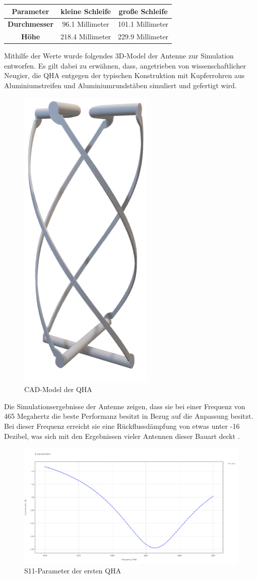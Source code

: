 \begin{center}
\begin{tabular}{|c|c|c|}
	\hline
	\textbf{Parameter} & \textbf{kleine Schleife} & \textbf{große Schleife} \\
	\hline
	\textbf{Durchmesser} & 96.1 Millimeter & 101.1 Millimeter \\
	\hline
	\textbf{Höhe} & 218.4 Millimeter & 229.9 Millimeter \\
	\hline
\end{tabular}
\end{center}

Mithilfe der Werte wurde folgendes 3D-Model der Antenne zur Simulation entworfen. Es gilt dabei zu erwähnen, dass, angetrieben von wissenschaftlicher Neugier, die QHA entgegen der typischen Konstruktion mit Kupferrohren aus Aluminiumstreifen und Aluminiumrundstäben simuliert und gefertigt wird. 

\begin{figure} [H]
	\centering
	\includegraphics[width=.25\linewidth]{../ref/qfh_render.png}
	\caption{CAD-Model der QHA}
	\label{fig:qfh_render}
\end{figure}

Die Simulationsergebnisse der Antenne zeigen, dass sie bei einer Frequenz von 465 Megahertz die beste Performanz besitzt in Bezug auf die Anpassung besitzt. Bei dieser Frequenz erreicht sie eine Rückflussdämpfung von etwas unter -16 Dezibel, was sich mit den Ergebnissen vieler Antennen dieser Bauart deckt \cite{noauthor_qfh_nodate} \cite{keller_quadrifilar_2015}.

\begin{figure} [H]
	\centering
	\includegraphics[width=\linewidth]{../ref/qfh_old_s11.png}
	\caption{S11-Parameter der ersten QHA}
	\label{fig:s11_old_qha}
\end{figure}

